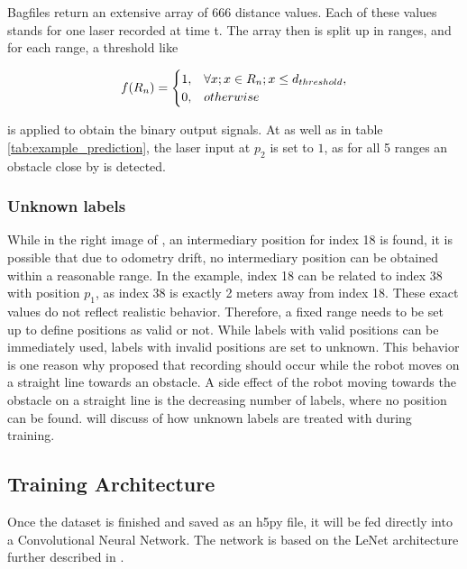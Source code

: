 Bagfiles return an extensive array of 666 distance values. Each of these values stands for one laser recorded at time t. The array then is split up in ranges, and for each range, a threshold like 

\begin{equation}
\label{eqn:9} 
f(R_{n}) =
\begin{cases}
$1$, & \forall x; x \in R_{n}; x \leq d_{threshold},\\
$0$,			&{otherwise}
\end{cases}
\end{equation}

is applied to obtain the binary output signals. At  as well as in table \ref{tab:example_prediction}, the laser input at $p_{2}$ is set to $1$, as for all 5 ranges an obstacle close by is detected.

\subsubsection{Unknown labels \label{unknownLabels} }
While in the right image of , an intermediary position for index 18 is found, it is possible that due to odometry drift, no intermediary position can be obtained within a reasonable range. In the example, index 18 can be related to index 38 with position $p_{1}$, as index 38 is exactly 2 meters away from index 18. These exact values do not reflect realistic behavior. Therefore, a fixed range needs to be set up to define positions as valid or not. While labels with valid positions can be immediately used, labels with invalid positions are set to unknown. This behavior is one reason why \cite{nava2019learning} proposed that recording should occur while the robot moves on a straight line towards an obstacle. A side effect of the robot moving towards the obstacle on a straight line is the decreasing number of labels, where no position can be found.  will discuss of how unknown labels are treated with during training.
\newpage

\subsection{Training Architecture \label{Training} }
Once the dataset is finished and saved as an h5py file, it will be fed directly into a Convolutional Neural Network. The network is based on the LeNet architecture further described in \cite{726791}.\\

